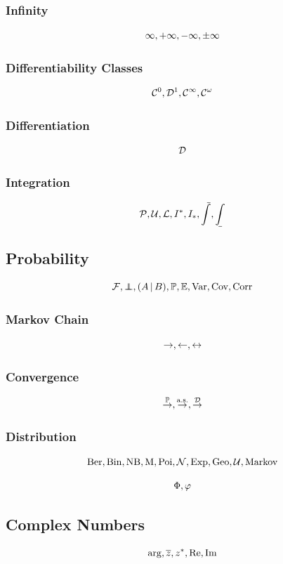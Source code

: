 \documentclass{article}
\begin{document}
\subsubsection{Infinity}
\[
    \infty, +\infty, -\infty, \pm\infty
\]

\subsubsection{Differentiability Classes}
\[
    \mathcal{C}^{0}, \mathcal{D}^{1}, \mathcal{C}^{\infty}, \mathcal{C}^{\omega}
\]

\subsubsection{Differentiation}
\[
    \mathcal{D}
\]

\subsubsection{Integration}
\[
    \partition, \upperSum, \lowerSum, \upperI, \lowerI, \upperInt, \lowerInt
\]

\subsection{Probability}
\[
    \eventSpace, \indp, \pqty{\Conditional{A}{B}}, \Prob, \Expt, \Var, \Cov, \Corr
\]

\subsubsection{Markov Chain}
\[
    \rightarrow, \leftarrow, \leftrightarrow
\]

\subsubsection{Convergence}
\[
    \overset{\mathbb{P}}{\to}, \overset{\text{a.s.}}{\to}, \overset{\mathcal{D}}{\to}
\]

\subsubsection{Distribution}
\[
    \operatorname{Ber}, \operatorname{Bin}, \operatorname{NB}, \operatorname{M}, \operatorname{Poi}, \operatorname{\mathcal{N}}, \operatorname{Exp}, \operatorname{Geo}, \operatorname{\mathcal{U}}, \operatorname{Markov}
\]

\[
    \Phi, \varphi
\]

\subsection{Complex Numbers}
\[
    \arg, \overline{z}, z^{\ast}, \Re, \Im
\]
\end{document}
